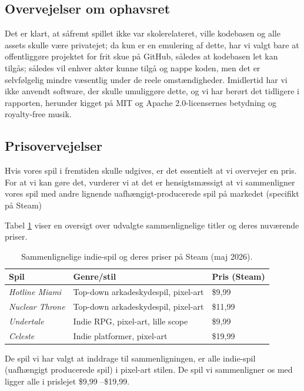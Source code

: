 \subsection{Overvejelser om ophavsret}
Det er klart, at såfremt spillet ikke var skolerelateret, ville kodebasen og alle assets skulle være privatejet; da kun er en emulering af dette, har vi valgt bare at offentliggøre projektet for frit skue på GitHub, således at kodebasen let kan tilgås; således vil enhver aktør kunne tilgå og nappe koden, men det er selvfølgelig mindre væsentlig under de reele omstændigheder. Imidlertid har vi ikke anvendt software, der skulle umuliggøre dette, og vi har berørt det tidligere i rapporten, herunder kigget på MIT og Apache 2.0-licensernes betydning og royalty-free musik.
\subsection{Prisovervejelser}
Hvis vores spil i fremtiden skulle udgives, er det essentielt at vi overvejer en pris. For at vi kan gøre det, vurderer vi at det er hensigtsmæssigt at vi sammenligner vores spil med andre lignende uafhængigt-producerede spil på markedet (specifikt på Steam)

Tabel \ref{tab:priser} 
viser en oversigt over udvalgte sammenlignelige titler og deres nuværende priser.

\begin{table}[H]
\centering
\begin{tabular}{lll}
\hline
\textbf{Spil} & \textbf{Genre/stil} & \textbf{Pris (Steam)} \\
\hline
\textit{Hotline Miami}  & Top-down arkadeskydespil, pixel-art & \$9{,}99 \\
\textit{Nuclear Throne} & Top-down arkadeskydespil, pixel-art & \$11{,}99 \\
\textit{Undertale}      & Indie RPG, pixel-art, lille scope   & \$9{,}99 \\
\textit{Celeste}        & Indie platformer, pixel-art         & \$19{,}99 \\
\hline
\end{tabular}
\caption{Sammenlignelige indie-spil og deres priser på Steam (maj 2026).}
\label{tab:priser}
\end{table}

De spil vi har valgt at inddrage til sammenligningen, er alle indie-spil (uafhængigt producerede spil) i pixel-art stilen. De spil vi sammenligner os med ligger alle i prislejet \$9,99 --\$19,99.

